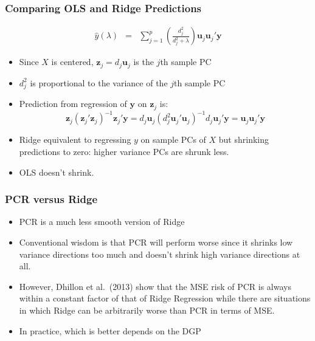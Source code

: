 \begin{frame}
  \frametitle{Comparing OLS and Ridge Predictions}
  \small

  \begin{eqnarray*}
  \widehat{y}(\lambda) &=&
   \sum_{j=1}^p   \left( \frac{d_j^2}{d_j^2 + \lambda} \right)\mathbf{u}_j\mathbf{u}_j'\mathbf{y}
  \end{eqnarray*}

  \begin{itemize}
    \item Since $X$ is centered, $\mathbf{z}_j = d_j\mathbf{u}_j$ is the $j$th sample PC
    \item $d_j^2$ is proportional to the \alert{variance} of the $j$th sample PC
    \item Prediction from regression of $\mathbf{y}$ on $\mathbf{z}_j$ is: 
      \[ \mathbf{z}_j(\mathbf{z}_j'\mathbf{z}_j)^{-1}\mathbf{z}_j' \mathbf{y} = 
        d_j \mathbf{u}_j\left( d_j^2 \mathbf{u}_j' \mathbf{u}_j \right)^{-1} d_j \mathbf{u}_j'\mathbf{y} = \mathbf{u}_j\mathbf{u}_j'\mathbf{y}  
      \]
    \item Ridge equivalent to regressing $y$ on sample PCs of $X$ but shrinking predictions to zero: higher variance PCs are shrunk less.
    \item OLS doesn't shrink.
  \end{itemize}

\end{frame}
\begin{frame}
  \frametitle{PCR versus Ridge}
  \begin{itemize}
    \item PCR is a much less smooth version of Ridge
    \item Conventional wisdom is that PCR will perform worse since it shrinks low variance directions too much and doesn't shrink high variance directions at all.
  \item However, Dhillon et al.\ (2013) show that the MSE risk of PCR is always within a constant factor of that of Ridge Regression while there are situations in which Ridge can be arbitrarily worse than PCR in terms of MSE. 
    \item In practice, which is better depends on the DGP
  \end{itemize}
\end{frame}
